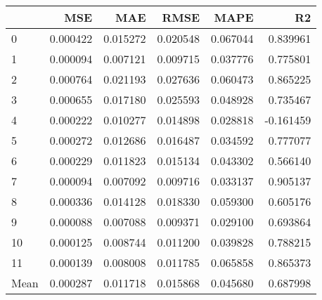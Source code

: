 \begin{tabular}{lrrrrr}
\toprule
 & MSE & MAE & RMSE & MAPE & R2 \\
\midrule
0 & 0.000422 & 0.015272 & 0.020548 & 0.067044 & 0.839961 \\
1 & 0.000094 & 0.007121 & 0.009715 & 0.037776 & 0.775801 \\
2 & 0.000764 & 0.021193 & 0.027636 & 0.060473 & 0.865225 \\
3 & 0.000655 & 0.017180 & 0.025593 & 0.048928 & 0.735467 \\
4 & 0.000222 & 0.010277 & 0.014898 & 0.028818 & -0.161459 \\
5 & 0.000272 & 0.012686 & 0.016487 & 0.034592 & 0.777077 \\
6 & 0.000229 & 0.011823 & 0.015134 & 0.043302 & 0.566140 \\
7 & 0.000094 & 0.007092 & 0.009716 & 0.033137 & 0.905137 \\
8 & 0.000336 & 0.014128 & 0.018330 & 0.059300 & 0.605176 \\
9 & 0.000088 & 0.007088 & 0.009371 & 0.029100 & 0.693864 \\
10 & 0.000125 & 0.008744 & 0.011200 & 0.039828 & 0.788215 \\
11 & 0.000139 & 0.008008 & 0.011785 & 0.065858 & 0.865373 \\
Mean & 0.000287 & 0.011718 & 0.015868 & 0.045680 & 0.687998 \\
\bottomrule
\end{tabular}

